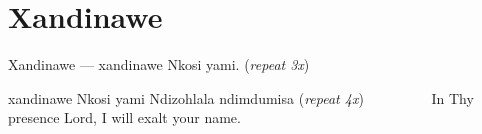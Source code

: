 \starttocol
\chapter{Xandinawe}
\nexttocol
\hfill{\it }
\stoptocol
\starttocol
\startlines
{\sc Xandinawe} --- xandinawe Nkosi yami.
         \hfill({\it repeat 3x})~~~~~~~~~

xandinawe Nkosi yami
Ndizohlala ndimdumisa
         \hfill({\it repeat 4x})~~~~~~~~~
\stoplines
\nexttocol
In Thy presence Lord, I will exalt your name.
\stoptocol
